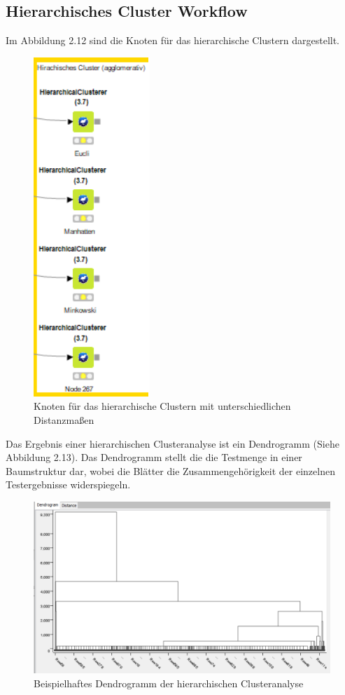 \documentclass[12pt,					%
							 oneside,			%
							 a4paper,			%
							 halfparskip,		%
							 liststotoc,			%
							 bibtotoc,			%
							 fleqn,				%
							 pointlessnumbers]	%
							 {scrreprt}
\begin{document}
		\subsection{Hierarchisches Cluster Workflow}
		Im Abbildung 2.12 sind die Knoten für das hierarchische Clustern dargestellt.
		\begin{figure}[!h]
			\begin{center}
				\includegraphics[scale=0.8]{pictures/hierach.png}
				\caption{Knoten für das hierarchische Clustern mit unterschiedlichen Distanzmaßen}
			\end{center}
		\end{figure}
		Das Ergebnis einer hierarchischen Clusteranalyse ist ein Dendrogramm (Siehe Abbildung 2.13). Das Dendrogramm stellt die die Testmenge in einer Baumstruktur dar, wobei die Blätter die Zusammengehörigkeit der einzelnen Testergebnisse widerspiegeln.
		\begin{figure}[!h]
			\begin{center}
				\includegraphics[scale=0.4]{pictures/dendro.png}
				\caption{Beispielhaftes Dendrogramm der hierarchischen Clusteranalyse}
			\end{center}
		\end{figure}
\end{document}

